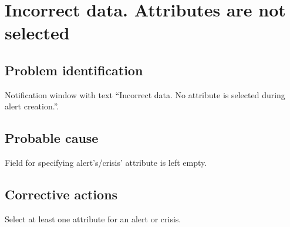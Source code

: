 \section{Incorrect data. Attributes are not selected}

\subsection{Problem identification}
Notification window with text ``Incorrect data. No attribute is selected during
alert creation.''.

\subsection{Probable cause}
Field for specifying alert's/crisis' attribute is left empty.

\subsection{Corrective actions}
Select at least one attribute for an alert or crisis.